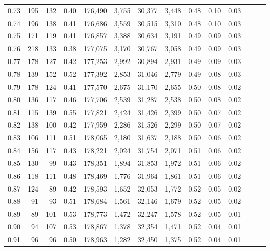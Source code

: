 \begin{tabular}{rrrrrrrrrrrrrr}
0.73 &    195 &  132 &  0.40 &  176,490 &    3,755 &  30,377 &   3,448 &  0.48 &  0.10 &      0.03 \\
0.74 &    196 &  138 &  0.41 &  176,686 &    3,559 &  30,515 &   3,310 &  0.48 &  0.10 &      0.03 \\
0.75 &    171 &  119 &  0.41 &  176,857 &    3,388 &  30,634 &   3,191 &  0.49 &  0.09 &      0.03 \\
0.76 &    218 &  133 &  0.38 &  177,075 &    3,170 &  30,767 &   3,058 &  0.49 &  0.09 &      0.03 \\
0.77 &    178 &  127 &  0.42 &  177,253 &    2,992 &  30,894 &   2,931 &  0.49 &  0.09 &      0.03 \\
0.78 &    139 &  152 &  0.52 &  177,392 &    2,853 &  31,046 &   2,779 &  0.49 &  0.08 &      0.03 \\
0.79 &    178 &  124 &  0.41 &  177,570 &    2,675 &  31,170 &   2,655 &  0.50 &  0.08 &      0.02 \\
0.80 &    136 &  117 &  0.46 &  177,706 &    2,539 &  31,287 &   2,538 &  0.50 &  0.08 &      0.02 \\
0.81 &    115 &  139 &  0.55 &  177,821 &    2,424 &  31,426 &   2,399 &  0.50 &  0.07 &      0.02 \\
0.82 &    138 &  100 &  0.42 &  177,959 &    2,286 &  31,526 &   2,299 &  0.50 &  0.07 &      0.02 \\
0.83 &    106 &  111 &  0.51 &  178,065 &    2,180 &  31,637 &   2,188 &  0.50 &  0.06 &      0.02 \\
0.84 &    156 &  117 &  0.43 &  178,221 &    2,024 &  31,754 &   2,071 &  0.51 &  0.06 &      0.02 \\
0.85 &    130 &   99 &  0.43 &  178,351 &    1,894 &  31,853 &   1,972 &  0.51 &  0.06 &      0.02 \\
0.86 &    118 &  111 &  0.48 &  178,469 &    1,776 &  31,964 &   1,861 &  0.51 &  0.06 &      0.02 \\
0.87 &    124 &   89 &  0.42 &  178,593 &    1,652 &  32,053 &   1,772 &  0.52 &  0.05 &      0.02 \\
0.88 &     91 &   93 &  0.51 &  178,684 &    1,561 &  32,146 &   1,679 &  0.52 &  0.05 &      0.02 \\
0.89 &     89 &  101 &  0.53 &  178,773 &    1,472 &  32,247 &   1,578 &  0.52 &  0.05 &      0.01 \\
0.90 &     94 &  107 &  0.53 &  178,867 &    1,378 &  32,354 &   1,471 &  0.52 &  0.04 &      0.01 \\
0.91 &     96 &   96 &  0.50 &  178,963 &    1,282 &  32,450 &   1,375 &  0.52 &  0.04 &      0.01 \\

\end{tabular}
